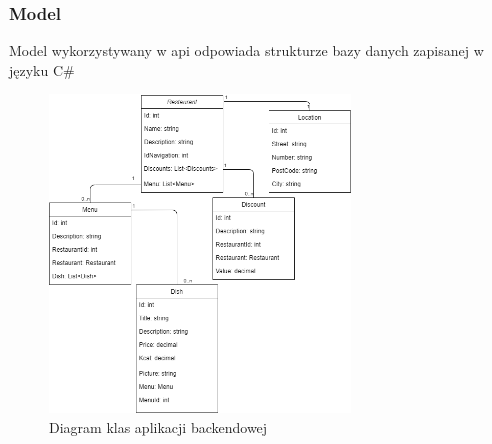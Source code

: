 \documentclass{article}
\begin{document}
		\subsubsection{Model}
			Model wykorzystywany w api odpowiada strukturze bazy danych zapisanej w języku C\#
			\begin{figure}[hbt!]
				\includegraphics[width=8cm]{Files/Pictures/DiagramKlas}
				\centering
				\caption{Diagram klas aplikacji backendowej}
			\end{figure}
\end{document}
